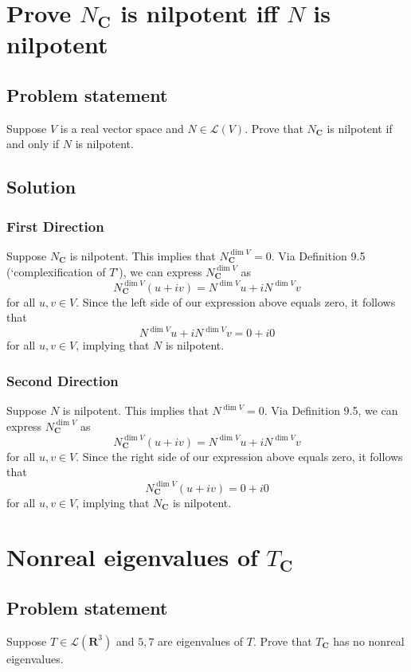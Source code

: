 \documentclass{article}
\begin{document}
\clearpage

\section{Prove $N_{\mathbf{C}}$ is nilpotent iff $N$ is nilpotent}
\subsection*{Problem statement}
Suppose $V$ is a real vector space and $N\in\mathcal{L}(V)$. Prove that $N_{\mathbf{C}}$ is nilpotent if and only if $N$ is nilpotent.

\subsection*{Solution}
\subsubsection*{First Direction}
Suppose $N_{\mathbf{C}}$ is nilpotent. 
This implies that $N_{\mathbf{C}}^{\dim V}=0$. 
Via Definition 9.5 (`complexification of $T$'), we can express $N_{\mathbf{C}}^{\dim V}$ as
\[N_{\mathbf{C}}^{\dim V}(u+iv)=N^{\dim V}u+iN^{\dim V}v\]
for all $u,v\in V$. 
Since the left side of our expression above equals zero, it follows that
\[N^{\dim V}u+iN^{\dim V}v=0+i0\]
for all $u,v\in V$, implying that $N$ is nilpotent.

\subsubsection*{Second Direction}
Suppose $N$ is nilpotent. 
This implies that $N^{\dim V}=0$. 
Via Definition 9.5, we can express $N_{\mathbf{C}}^{\dim V}$ as
\[N_{\mathbf{C}}^{\dim V}(u+iv)=N^{\dim V}u+iN^{\dim V}v\]
for all $u,v\in V$. 
Since the right side of our expression above equals zero, it follows that
\[N_{\mathbf{C}}^{\dim V}(u+iv)=0+i0\]
for all $u,v\in V$, implying that $N_{\mathbf{C}}$ is nilpotent.

\clearpage

\section{Nonreal eigenvalues of $T_{\mathbf{C}}$}
\subsection*{Problem statement}
Suppose $T\in\mathcal{L}(\mathbf{R}^3)$ and $5,7$ are eigenvalues of $T$. Prove that $T_{\mathbf{C}}$ has no nonreal eigenvalues.
\end{document}
